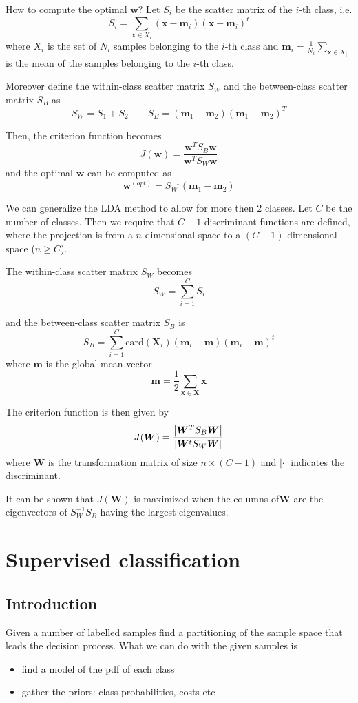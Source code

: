 \documentclass[oneside,onecolumn]{report}
\begin{document}
How to compute the optimal $\bm w$?
Let $S_i$ be the scatter matrix of the $i$-th class, i.e.
$$ S_i = \sum_{\bm x \in X_i} (\bm x - \bm m_i) (\bm x - \bm m_i)^t $$
where $X_i$ is the set of $N_i$ samples belonging to the $i$-th class and $\bm m_i = \frac{1}{N_i} \sum_{\bm x \in X_i}$ is the mean of the samples belonging to the $i$-th class.

Moreover define the within-class scatter matrix $S_W$ and the between-class scatter matrix $S_B$ as
$$ S_W = S_1 + S_2 \qquad S_B = (\bm m_1 - \bm m_2)(\bm m_1 - \bm m_2)^T $$

Then, the criterion function becomes
$$ J(\bm w) = \frac{\bm w^T S_B \bm w}{\bm w^T S_W \bm w} $$
and the optimal $\bm w$ can be computed as
$$ \bm w^{(opt)} = S_W^{-1} (\bm m_1 - \bm m_2) $$

We can generalize the LDA method to allow for more then 2 classes.
Let $C$ be the number of classes.
Then we require that $C - 1$ discriminant functions are defined, where the projection is from a $n$ dimensional space to a $(C - 1)$-dimensional space ($n \geq C$).

The within-class scatter matrix $S_W$ becomes
$$ S_W = \sum_{i = 1}^C S_i $$

and the between-class scatter matrix $S_B$ is
$$ S_B = \sum_{i = 1}^C \text{card}(\bm X_i) (\bm m_i - \bm m) (\bm m_i - \bm m)^t $$
where $\bm m$ is the global mean vector
$$ \bm m = \frac{1}{2} \sum_{\bm x \in \bm X} \bm x $$

The criterion function is then given by
$$ J(\bm W) = \frac{\abs{\bm W^T S_B \bm W}}{\abs{\bm W^t S_W \bm W}} $$
where $\bm W$ is the transformation matrix of size $n \times (C - 1)$ and $|\cdot|$ indicates the discriminant.

It can be shown that $J(\bm W)$ is maximized when the columns of$\bm W$ are the eigenvectors of $S_W^{-1} S_B$ having the largest eigenvalues.



\clearpage
\chapter{Supervised classification}

\section{Introduction}
Given a number of labelled samples find a partitioning of the sample space that leads the decision process.
What we can do with the given samples is
\begin{itemize}
    \item find a model of the pdf of each class
    \item gather the priors: class probabilities, costs etc
\end{itemize}
\end{document}
